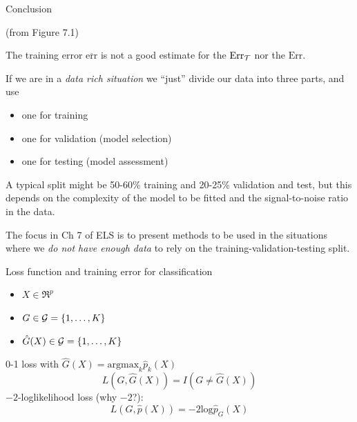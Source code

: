 \documentclass[
  ignorenonframetext,
]{beamer}
\providecommand{\tightlist}{%
  \setlength{\itemsep}{0pt}\setlength{\parskip}{0pt}}
\begin{document}
\begin{frame}

\begin{block}{Conclusion}

(from Figure 7.1)

The training error \(\overline{\text{err}}\) is not a good estimate for
the \(\text{Err}_{\cal T}\) nor the \(\text{Err}\).

If we are in a \emph{data rich situation} we ``just'' divide our data
into three parts, and use

\begin{itemize}
\tightlist
\item
  one for training
\item
  one for validation (model selection)
\item
  one for testing (model assessment)
\end{itemize}

A typical split might be 50-60\% training and 20-25\% validation and
test, but this depends on the complexity of the model to be fitted and
the signal-to-noise ratio in the data.

The focus in Ch 7 of ELS is to present methods to be used in the
situations where we \emph{do not have enough data} to rely on the
training-validation-testing split.

\end{block}

\end{frame}

\begin{frame}

\begin{block}{Loss function and training error for classification}

\begin{itemize}
\tightlist
\item
  \(X \in \Re^p\)
\item
  \(G \in {\cal G}=\{1,\ldots,K\}\)
\item
  \(\hat{G}(X) \in {\cal G}=\{1,\ldots,K\}\)
\end{itemize}

0-1 loss with \(\hat{G}(X)=\text{argmax}_k \hat{p}_k(X)\)
\[L(G,\hat{G}(X))=I(G\neq \hat{G}(X))\] \(-2\)-loglikelihood loss (why
\(-2\)?): \[ L(G,\hat{p}(X))=-2 \text{log} \hat{p}_G(X)\]

\end{block}

\end{frame}
\end{document}
